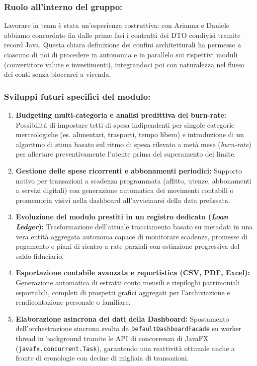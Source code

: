 \documentclass[11pt,a4paper,openright]{report}
\begin{document}
\subsubsection*{Ruolo all'interno del gruppo:}
Lavorare in team è stata un'esperienza costruttiva: con Arianna e Daniele abbiamo concordato fin dalle prime fasi i contratti dei DTO condivisi tramite record Java. Questa chiara definizione dei confini architetturali ha permesso a ciascuno di noi di procedere in autonomia e in parallelo sui rispettivi moduli (convertitore valute e investimenti), integrandoci poi con naturalezza nel flusso dei conti senza bloccarci a vicenda.

\subsubsection*{Sviluppi futuri specifici del modulo:}
\begin{enumerate}
  \item \textbf{Budgeting multi-categoria e analisi predittiva del burn-rate:} Possibilità di impostare tetti di spesa indipendenti per singole categorie merceologiche (es. alimentari, trasporti, tempo libero) e introduzione di un algoritmo di stima basato sul ritmo di spesa rilevato a metà mese (\emph{burn-rate}) per allertare preventivamente l'utente prima del superamento del limite.
  \item \textbf{Gestione delle spese ricorrenti e abbonamenti periodici:} Supporto nativo per transazioni a scadenza programmata (affitto, utenze, abbonamenti a servizi digitali) con generazione automatica dei movimenti contabili o promemoria visivi nella dashboard all'avvicinarsi della data prefissata.
  \item \textbf{Evoluzione del modulo prestiti in un registro dedicato (\emph{Loan Ledger}):} Trasformazione dell'attuale tracciamento basato su metadati in una vera entità aggregata autonoma capace di monitorare scadenze, promesse di pagamento e piani di rientro a rate parziali con estinzione progressiva del saldo fiduciario.
  \item \textbf{Esportazione contabile avanzata e reportistica (CSV, PDF, Excel):} Generazione automatica di estratti conto mensili e riepiloghi patrimoniali esportabili, completi di prospetti grafici aggregati per l'archiviazione e rendicontazione personale o familiare.
  \item \textbf{Elaborazione asincrona dei dati della Dashboard:} Spostamento dell'orchestrazione sincrona svolta da \texttt{DefaultDashboardFacade} su worker thread in background tramite le API di concorrenza di JavaFX (\texttt{javafx.concurrent.Task}), garantendo una reattività ottimale anche a fronte di cronologie con decine di migliaia di transazioni.
\end{enumerate}
\end{document}
